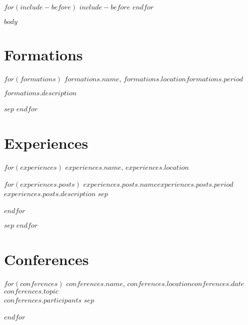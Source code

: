\documentclass[
$if(fontsize)$
    $fontsize$,
$endif$
$if(lang)$
    $babel-lang$,
$endif$
$if(papersize)$
    $papersize$paper,
$endif$
$for(classoption)$
    $classoption$$sep$,
$endfor$
]{$documentclass$}
\begin{document}
$for(include-before)$
    $include-before$
$endfor$

$body$

\section{Formations}
\footnotesize
\begin{adjustwidth}{3cm}{0cm}
    $for(formations)$
    \textbf{$formations.name$}, $formations.location$\hfill \textit{$formations.period$}
        \begin{adjustwidth}{0.6cm}{0cm}
            $formations.description$
        \end{adjustwidth}
        $sep$\vspace{0.8cm}
    $endfor$
\end{adjustwidth}

\section{Experiences}
\footnotesize
\begin{adjustwidth}{3cm}{0cm}
    $for(experiences)$
    \textbf{$experiences.name$}, $experiences.location$
        \begin{adjustwidth}{0.6cm}{0cm}
            $for(experiences.posts)$
                \textit{$experiences.posts.name$}\hfill \textit{$experiences.posts.period$}\\
                $experiences.posts.description$
                $sep$\\\\
            $endfor$
        \end{adjustwidth}
        $sep$\vspace{0.8cm}
    $endfor$
\end{adjustwidth}

\section{Conferences}
\footnotesize
\begin{adjustwidth}{3cm}{0cm}
    $for(conferences)$
    \textbf{$conferences.name$}, $conferences.location$\hfill \textit{$conferences.date$}\\
        $conferences.topic$\\
        \textit{$conferences.participants$}
        $sep$\\\\
    $endfor$
\end{adjustwidth}
\end{document}
